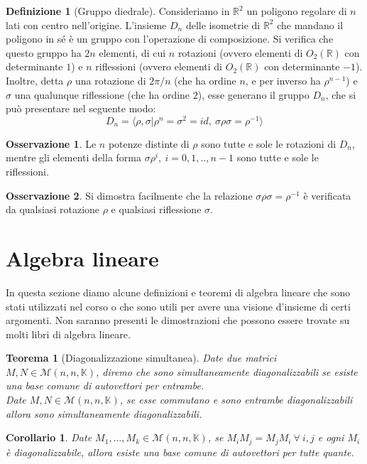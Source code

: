 \documentclass[11pt]{article}
\theoremstyle{plain}
\newtheorem{thm}{Teorema}[section]
\newtheorem*{cor}{Corollario}
\theoremstyle{definition}
\newtheorem{defn}{Definizione}[section]
\newtheorem*{rem}{Osservazione}
\theoremstyle{remark}
\newcommand{\R}{\mathbb{R}}
\newcommand{\K}{\mathbb{K}}
\begin{document}
\begin{defn}[Gruppo diedrale]
Consideriamo in $\R^2$ un poligono regolare di $n$ lati con centro nell'origine.
L'insieme $D_n$ delle isometrie di $\R^2$ che mandano il poligono in sé è un gruppo con l'operazione di composizione.
Si verifica che questo gruppo ha $2n$ elementi, di cui $n$ rotazioni (ovvero elementi di $O_2(\R)$ con determinante $1$)
e $n$ riflessioni (ovvero elementi di $O_2(\R)$ con determinante $-1$).
Inoltre, detta $\rho$ una rotazione di $2\pi/n$ (che ha ordine $n$, e per inverso ha $\rho^{n-1}$) e $\sigma$ una qualunque riflessione (che ha ordine $2$), esse generano
il gruppo $D_n$, che si può presentare nel seguente modo: $$D_n=\langle\rho,\sigma|\rho^n=\sigma^2=id,\ \sigma\rho\sigma=\rho^{-1}\rangle$$
\end{defn}

\begin{rem}
 Le $n$ potenze distinte di $\rho$ sono tutte e sole le rotazioni di $D_n$, mentre gli elementi della forma $\sigma\rho^{i},\ i=0,1,..,n-1$
 sono tutte e sole le riflessioni.
\end{rem}

\begin{rem}
 Si dimostra facilmente che la relazione $\sigma\rho\sigma=\rho^{-1}$ è verificata da qualsiasi rotazione $\rho$
 e qualsiasi riflessione $\sigma$.
\end{rem}











\newpage
\section{Algebra lineare}
In questa sezione diamo alcune definizioni e teoremi di algebra lineare che sono stati utilizzati nel corso o che sono utili per avere una visione d'insieme di certi argomenti. Non saranno presenti le dimostrazioni che possono essere trovate su molti libri di algebra lineare.
\begin{thm}[Diagonalizzazione simultanea]
\label{thm:diag_sim}
	Date due matrici $M, N\in \mathcal{M}(n,n,\K)$, diremo che sono \textit{simultaneamente diagonalizzabili} se esiste una base comune di autovettori per entrambe.\\
	Date $M, N\in \mathcal{M}(n,n,\K)$, se esse commutano e sono entrambe diagonalizzabili allora sono simultaneamente diagonalizzabili.
\end{thm}
\begin{cor}
	Date $M_1,\ldots,M_k \in \mathcal{M}(n,n,\K)$, se $M_iM_j=M_jM_i\ \forall\ i, j$ e ogni $M_i$ è diagonalizzabile, allora esiste una base comune di autovettori per tutte quante.
\end{cor}
\end{document}
